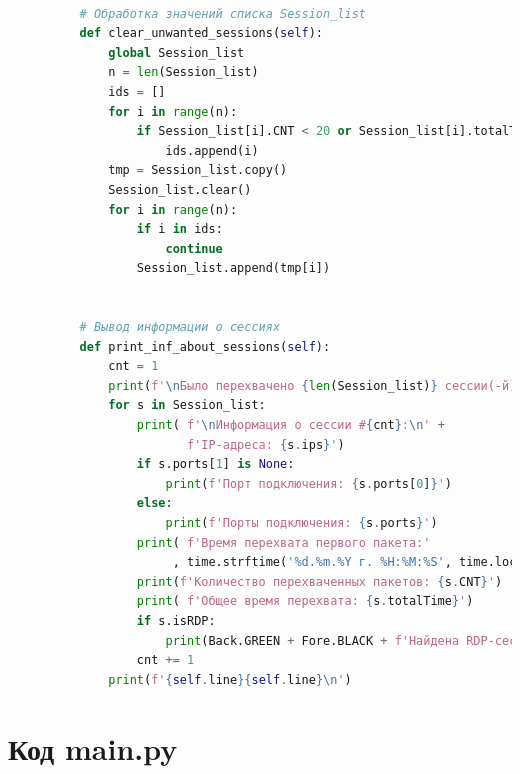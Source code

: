 \documentclass[bachelor, och, coursework]{SCWorks}
\begin{document}
\begin{lstlisting}[language=Python]
      
          # Обработка значений списка Session_list
          def clear_unwanted_sessions(self):
              global Session_list
              n = len(Session_list)
              ids = []
              for i in range(n):
                  if Session_list[i].CNT < 20 or Session_list[i].totalTime < 10:
                      ids.append(i)
              tmp = Session_list.copy()
              Session_list.clear()
              for i in range(n):
                  if i in ids:
                      continue
                  Session_list.append(tmp[i])
      
      
          # Вывод информации о сессиях
          def print_inf_about_sessions(self):
              cnt = 1
              print(f'\nБыло перехвачено {len(Session_list)} сессии(-й)')
              for s in Session_list:
                  print( f'\nИнформация о сессии #{cnt}:\n' +
                         f'IP-адреса: {s.ips}')
                  if s.ports[1] is None:
                      print(f'Порт подключения: {s.ports[0]}')
                  else:
                      print(f'Порты подключения: {s.ports}')
                  print( f'Время перехвата первого пакета:'
                       , time.strftime('%d.%m.%Y г. %H:%M:%S', time.localtime(s.strt_time)) )
                  print(f'Количество перехваченных пакетов: {s.CNT}')
                  print( f'Общее время перехвата: {s.totalTime}')
                  if s.isRDP:
                      print(Back.GREEN + Fore.BLACK + f'Найдена RDP-сессия!!!')
                  cnt += 1
              print(f'{self.line}{self.line}\n')
    \end{lstlisting}


    \section{Код main.py}
\end{document}
